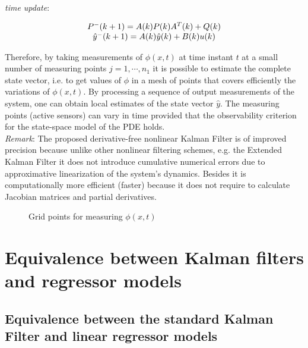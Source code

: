 \documentclass[journal]{IEEEtran}
\begin{document}
\noindent \textit{time update}:

\begin{equation} \label{KF_time_update}
\begin{tabular}{c}
$P^{-}(k+1)={A(k)}P(k)A^T(k)+Q(k)$\\
${\hat{y}^{-}(k+1)}=A(k)\hat{y}(k)+B(k)u(k)$
\end{tabular}
\end{equation}

\noindent Therefore, by taking measurements of $\phi(x,t)$ at time instant $t$ at a small number of measuring points $j=1,\cdots,n_1$ it is possible to estimate the complete state vector, i.e. to get values of $\phi$ in a mesh of points that covers efficiently the variations of $\phi(x,t)$. By processing a sequence of output measurements of the system, one can obtain local estimates of the state vector $\hat{y}$. The measuring points (active sensors) can vary in time provided that the observability criterion for the state-space model of the PDE holds.\\

\noindent \textit{Remark}: The proposed derivative-free nonlinear Kalman Filter is of improved precision because unlike other nonlinear filtering schemes, e.g. the Extended Kalman Filter it does not introduce cumulative numerical errors due to approximative linearization of the system's dynamics. Besides it is computationally more efficient (faster) because it does not require to calculate Jacobian matrices and partial derivatives.


\begin{figure}[htb]
\begin{center}
\end{center}
\caption{Grid points for measuring $\phi(x,t)$} \label{figure : Grid_points}
\end{figure}

\section{Equivalence between Kalman filters and regressor models}  \label{section 4 : Equivalence_between_Kalman_Filters_and_regressor_models}

\subsection{Equivalence between the standard Kalman Filter and linear regressor models}
\end{document}
